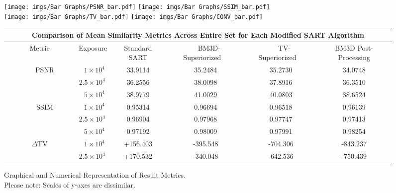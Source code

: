\documentclass[sigconf,twocolumn,nonacm=true]{acmart}
\newcommand{\e}[1]{\times10^{#1}} %
\begin{document}
\begin{figure*}[h]
\centering
\caption{Graphical and Numerical Representation of Result Metrics. \\\hspace*{-28pt}Please note: Scales of y-axes are dissimilar.}\bigskip\medskip\label{graphs}
\texttt{[image: imgs/Bar Graphs/PSNR\_bar.pdf]}
\texttt{[image: imgs/Bar Graphs/SSIM\_bar.pdf]} \\\bigskip
\texttt{[image: imgs/Bar Graphs/TV\_bar.pdf]}
\texttt{[image: imgs/Bar Graphs/CONV\_bar.pdf]} \\\bigskip\medskip
\begin{adjustbox}{width=0.98\linewidth}
\begin{tabular}[c]{|c|c||c|c|c|c|}
    \hline
    \multicolumn{6}{|c|}{\bf{Comparison of Mean Similarity Metrics Across Entire Set for Each Modified SART Algorithm}} \\
    \hline
    {Metric}  &{Exposure}  &{Standard SART}  &{~~BM3D-Superiorized~~}  &{~~TV-Superiorized~~} &{BM3D Post-Processing} \\
    \hline\hline
    \multirow[c]{3}{*}{~~~~~~~~PSNR~~~~~}  
        &$~~1\e{4}$  &33.9114  &35.2484  &35.2730  &34.0748  \\\cline{2-6}
        &$2.5\e{4}~$ &36.2556  &38.0098  &37.8916  &36.3510  \\\cline{2-6}
        &$~~5\e{4}$  &38.9779  &41.0029  &40.0803  &38.6524  \\\hline
        \hline
    \multirow[c]{3}{*}{~~~~~~~~SSIM~~~~~}
        &$~~1\e{4}$  &0.95314  &0.96694  &0.96518  &0.96139  \\\cline{2-6}
        &$2.5\e{4}~$ &0.96904  &0.97968  &0.97747  &0.97413  \\\cline{2-6}
        &$~~5\e{4}$  &0.97192  &0.98009  &0.97991  &0.98254  \\\hline
        \hline
    \multirow[c]{3}{*}{$\Delta$TV}
        &$~~1\e{4}$  &\hspace*{-5pt}+156.403  &\hspace*{-5pt}-395.548   &\hspace*{-5pt}-704.306  &\hspace*{-5pt}-843.237  \\\cline{2-6}
        &$2.5\e{4}~$ &\hspace*{-5pt}+170.532  &\hspace*{-5pt}-340.048   &\hspace*{-5pt}-642.536  &\hspace*{-5pt}-750.439  \\\cline{2-6}

\end{tabular}
\end{adjustbox}
\end{figure*}
\end{document}
